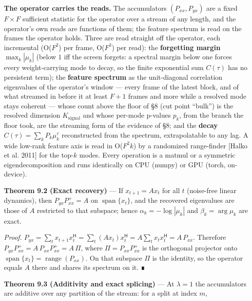\documentclass[10pt,letterpaper,twocolumn]{article}
\begin{document}
\textbf{The operator carries the reads.} The accumulators \((P_{xx},P_{yx})\) are a fixed \(F\times F\) sufficient statistic for the operator over a stream of any length, and the operator's own reads are functions of them; the feature spectrum is read on the frames the operator holds. Three are read straight off the operator, each incremental (O(\(F^2\)) per frame, O(\(F^3\)) per read): the \textbf{forgetting margin} \(\max_k|\mu_k|\) (below \(1\) iff the screen forgets: a spectral margin below one forces every weight-carrying mode to decay, so the finite exponential sum \(C(\tau)\) has no persistent term); the \textbf{feature spectrum} as the unit-diagonal correlation eigenvalues of the operator's window --- every frame of the latest block, and of what streamed in before it at least \(F+1\) frames and more while a resolved mode stays coherent --- whose count above the floor of §8 (cut point ``bulk'') is the resolved dimension \(K_{\mathrm{signal}}\) and whose per-mode p-values \(p_k\), from the branch the floor took, are the streaming form of the evidence of §8; and the \textbf{decay} \(C(\tau)=\sum_k P_k\mu_k^{\tau}\) reconstructed from the spectrum, extrapolatable to any lag. A wide low-rank feature axis is read in O(\(F^2 k\)) by a randomized range-finder {[}Halko et al. 2011{]} for the top-\(k\) modes. Every operation is a matmul or a symmetric eigendecomposition and runs identically on CPU (numpy) or GPU (torch, on-device).

\textbf{Theorem 9.2 (Exact recovery)} --- If \(x_{t+1}=Ax_t\) for all \(t\) (noise-free linear dynamics), then \(P_{yx}P_{xx}^{+}=A\) on \(\operatorname{span}\{x_t\}\), and the recovered eigenvalues are those of \(A\) restricted to that subspace; hence \(\alpha_k=-\log|\mu_k|\) and \(\beta_k=\arg\mu_k\) are exact.

\emph{Proof.} \(P_{yx}=\sum_t x_{t+1}x_t^{\mathsf H}=\sum_t (Ax_t)x_t^{\mathsf H}=A\sum_t x_tx_t^{\mathsf H}=A\,P_{xx}\). Therefore \(P_{yx}P_{xx}^{+}=A\,P_{xx}P_{xx}^{+}=A\,\Pi\), where \(\Pi=P_{xx}P_{xx}^{+}\) is the orthogonal projector onto \(\operatorname{span}\{x_t\}=\operatorname{range}(P_{xx})\). On that subspace \(\Pi\) is the identity, so the operator equals \(A\) there and shares its spectrum on it. ∎

\textbf{Theorem 9.3 (Additivity and exact splicing)} --- At \(\lambda=1\) the accumulators are additive over any partition of the stream: for a split at index \(m\),

\end{document}
